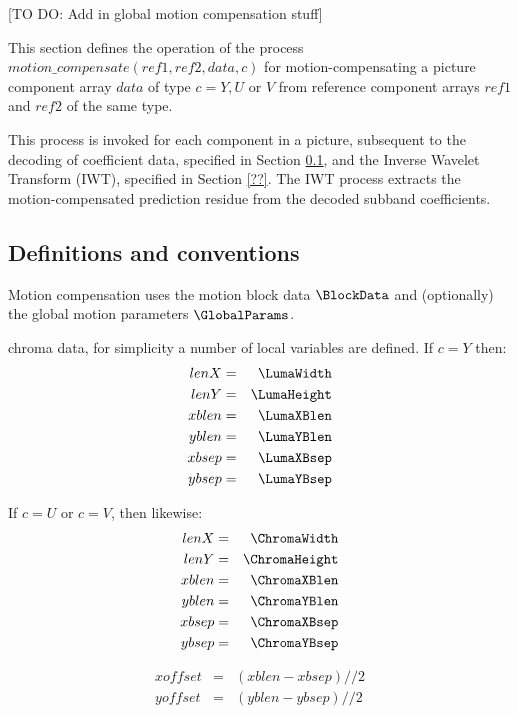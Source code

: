 [TO DO: Add in global motion compensation stuff]

This section defines the operation of the process
$motion\_compensate(ref1, ref2,  data, c)$ for motion-compensating a
picture component array  $data$ of type $c=Y, U$ or $V$ from reference 
component arrays $ref1$ and $ref2$ of the same type.

This process is invoked for each component in a picture, subsequent to the 
decoding of coefficient data, specified in Section \ref{}, and the Inverse Wavelet 
Transform (IWT), specified in Section \ref{??}. The IWT process extracts the
motion-compensated prediction residue from the decoded subband coefficients.

\subsection{Definitions and conventions}

Motion compensation uses the motion block data $\BlockData$ and (optionally) the
global motion parameters $\GlobalParams$.

chroma data, for simplicity a number of local variables are defined. If $c=Y$ then:
\begin{eqnarray*}
lenX & = & \LumaWidth \\
lenY & = & \LumaHeight \\
xblen & = & \LumaXBlen \\
yblen & = & \LumaYBlen \\
xbsep & = & \LumaXBsep \\
ybsep & = & \LumaYBsep
\end{eqnarray*}

If $c=U$ or $c=V$, then likewise:
\begin{eqnarray*}
lenX & = & \ChromaWidth \\
lenY & = & \ChromaHeight \\
xblen & = & \ChromaXBlen \\
yblen & = & \ChromaYBlen \\
xbsep & = & \ChromaXBsep \\
ybsep & = & \ChromaYBsep
\end{eqnarray*}

\begin{eqnarray*}
xoffset & = & (xblen-xbsep)//2 \\
yoffset & = & (yblen-ybsep)//2
\end{eqnarray*}

